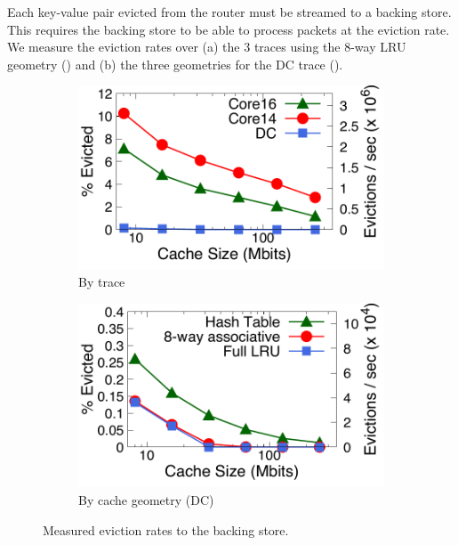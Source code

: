  Each key-value pair evicted from the router must be streamed to a backing store.
This requires the backing store to be able to process packets at the eviction rate. We measure the eviction rates over (a) the 3 traces using the 8-way LRU geometry () and (b) the three geometries for the DC trace ().
\begin{figure}[ht]
\centering
\vspace{-0.1in}
\begin{subfigure}[t]{0.48\columnwidth}
\raggedright
\includegraphics[width=\linewidth]{pq_eviction-rate-alltraces.pdf}
\caption{By trace}
\label{fig:eviction-traces}
\end{subfigure}
\begin{subfigure}[t]{0.48\columnwidth}
\raggedleft
\includegraphics[width=\linewidth]{pq_eviction-rate-geo-dc.pdf}
\caption{By cache geometry (DC)}
\label{fig:eviction-geo}
\end{subfigure}
\caption{Measured eviction rates to the backing store.}
\end{figure}

